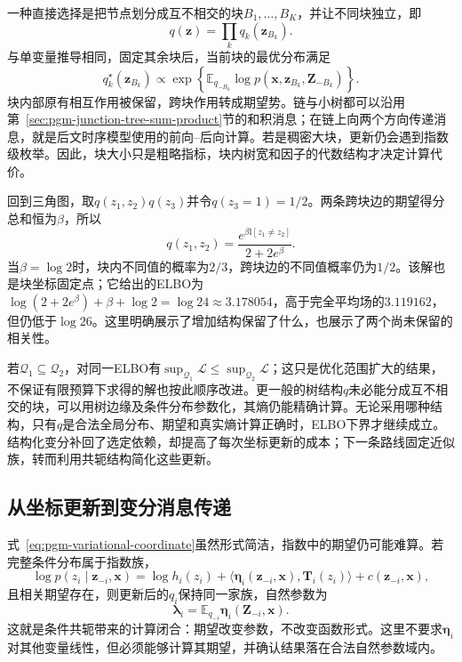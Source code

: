 一种直接选择是把节点划分成互不相交的块$B_1,\ldots,B_K$，并让不同块独立，即
\[
  q(\bm z)=\prod_k q_k(\bm z_{B_k}).
\]
与单变量推导相同，固定其余块后，当前块的最优分布满足
\begin{equation}
  q_k^\star(\bm z_{B_k})
     \propto\exp\left\{
       \mathbb E_{q_{-B_k}}\log p(\bm x,\bm z_{B_k},\bm Z_{-B_k})
     \right\}.
  \label{eq:pgm-variational-block}
\end{equation}
块内部原有相互作用被保留，跨块作用转成期望势。链与小树都可以沿用第~\ref{sec:pgm-junction-tree-sum-product}节的和积消息；在链上向两个方向传递消息，就是后文时序模型使用的前向--后向计算。若是稠密大块，更新仍会遇到指数级枚举。因此，块大小只是粗略指标，块内树宽和因子的代数结构才决定计算代价。

回到三角图，取$q(z_1,z_2)q(z_3)$并令$q(z_3=1)=1/2$。两条跨块边的期望得分总和恒为$\beta$，所以
\[
  q(z_1,z_2)=
    \frac{e^{\beta\mathbb I[z_1\ne z_2]}}{2+2e^\beta}.
\]
当$\beta=\log2$时，块内不同值的概率为$2/3$，跨块边的不同值概率仍为$1/2$。该解也是块坐标固定点；它给出的ELBO为$\log(2+2e^\beta)+\beta+\log2=\log24\approx3.178054$，高于完全平均场的$3.119162$，但仍低于$\log26$。这里明确展示了增加结构保留了什么，也展示了两个尚未保留的相关性。

若$\mathcal Q_1\subseteq\mathcal Q_2$，对同一ELBO有$\sup_{\mathcal Q_1}\mathcal L\leq\sup_{\mathcal Q_2}\mathcal L$；这只是优化范围扩大的结果，不保证有限预算下求得的解也按此顺序改进。更一般的树结构$q$未必能分成互不相交的块，可以用树边缘及条件分布参数化，其熵仍能精确计算。无论采用哪种结构，只有$q$是合法全局分布、期望和真实熵计算正确时，ELBO下界才继续成立。结构化变分补回了选定依赖，却提高了每次坐标更新的成本；下一条路线固定近似族，转而利用共轭结构简化这些更新。

\subsection{从坐标更新到变分消息传递}
\label{sec:pgm-variational-coordinate-vmp}
\label{sec:pgm-variational-vmp}

式~\eqref{eq:pgm-variational-coordinate}虽然形式简洁，指数中的期望仍可能难算。若完整条件分布属于指数族，
\[
  \log p(z_i\mid\bm{z}_{-i},\bm{x})
    =\log h_i(z_i)
      +\langle\bm{\eta}_i(\bm{z}_{-i},\bm{x}),\bm T_i(z_i)\rangle
      +c(\bm{z}_{-i},\bm{x}),
\]
且相关期望存在，则更新后的$q_i$保持同一家族，自然参数为
\begin{equation}
  \bm{\lambda}_i
    =\mathbb E_{q_{-i}}\bm{\eta}_i(\bm{Z}_{-i},\bm{x}).
  \label{eq:pgm-variational-conjugacy}
\end{equation}
这就是条件共轭带来的计算闭合：期望改变参数，不改变函数形式。这里不要求$\bm{\eta}_i$对其他变量线性，但必须能够计算其期望，并确认结果落在合法自然参数域内。

